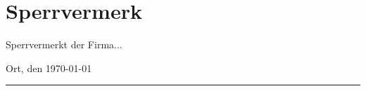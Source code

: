 \chapter*{Sperrvermerk}

\begin{otherlanguage}{german}


Sperrvermerkt der Firma...

\lipsum[3]

\vfill

\begin{minipage}[t]{0.4\textwidth}
    Ort, den \today
\end{minipage}
\qquad\qquad
\begin{minipage}[t]{0.4\textwidth}
    \rule{\linewidth}{0.5mm}\\
    \myName{}
\end{minipage}


\vfill
\vfill

\end{otherlanguage}